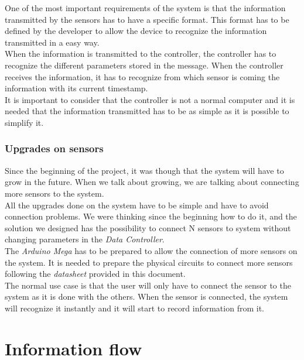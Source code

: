 One of the most important requirements of the system is that the information transmitted by the sensors has to have a specific format. This format has to be defined by the developer to allow the device to recognize the information transmitted in a easy way.\\

When the information is transmitted to the controller, the controller has to recognize the different parameters stored in the message. When the controller receives the information, it has to recognize from which sensor is coming the information with its current timestamp.\\

It is important to consider that the controller is not a normal computer and it is needed that the information transmitted has to be as simple as it is possible to simplify it.

\subsubsection{Upgrades on sensors}

Since the beginning of the project, it was though that the system will have to grow in the future. When we talk about growing, we are talking about connecting more sensors to the system.\\

All the upgrades done on the system have to be simple and have to avoid connection problems. We were thinking since the beginning how to do it, and the solution we designed has the possibility to connect N sensors to system without changing parameters in the \textit{Data Controller}.\\

The \textit{Arduino Mega} has to be prepared to allow the connection of more sensors on the system. It is needed to prepare the physical circuits to connect more sensors following the \textit{datasheet} provided in this document.\\

The normal use case is that the user will only have to connect the sensor to the system as it is done with the others. When the sensor is connected, the system will recognize it instantly and it will start to record information from it.

\section{Information flow}

